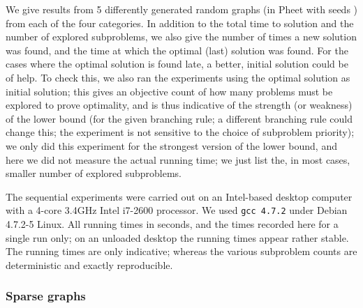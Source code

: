 \documentclass[a4paper,11pt]{article}
\begin{document}
We give results from 5 differently generated random graphs (in Pheet
with seeds ) from each of the four categories. In addition
to the total time to solution and the number of explored subproblems,
we also give the number of times a new solution was found, and the
time at which the optimal (last) solution was found. For the cases
where the optimal solution is found late, a better, initial solution
could be of help. To check this, we also ran the experiments using the
optimal solution as initial solution; this gives an objective count of
how many problems must be explored to prove optimality, and is thus
indicative of the strength (or weakness) of the lower bound (for the
given branching rule; a different branching rule could change this;
the experiment is not sensitive to the choice of subproblem priority);
we only did this experiment for the strongest version of the lower
bound, and here we did not measure the actual running time; we just
list the, in most cases, smaller number of explored subproblems.

The sequential experiments were carried out on an Intel-based desktop
computer with a 4-core 3.4GHz Intel i7-2600 processor. We used
\texttt{gcc 4.7.2} under Debian 4.7.2-5 Linux.  All running times in
seconds, and the times recorded here for a single run only; on an
unloaded desktop the running times appear rather stable. The running
times are only indicative; whereas the various subproblem counts are
deterministic and exactly reproducible.

\subsubsection{Sparse graphs}
\end{document}
